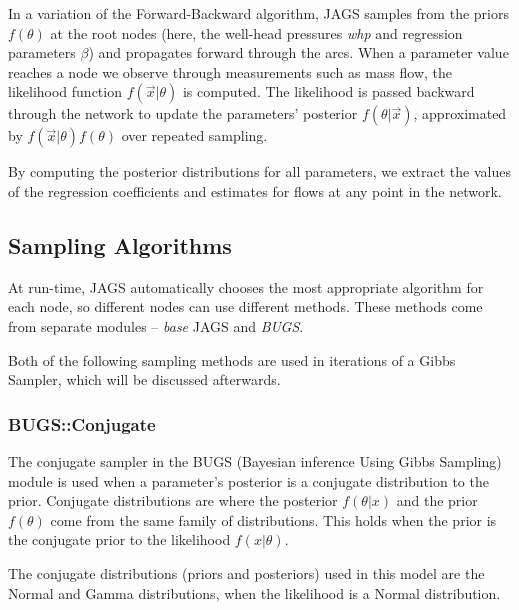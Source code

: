 \documentclass[a4paper, 12pt]{article}
\begin{document}
In a variation of the Forward-Backward algorithm, JAGS samples from the priors $f(\theta)$ at the root nodes (here, the well-head pressures \emph{whp} and regression parameters $\beta$) and propagates forward through the arcs. When a parameter value reaches a node we observe through measurements such as mass flow, the likelihood function $f(\vec{x}|\theta)$ is computed. The likelihood is passed backward through the network to update the parameters' posterior $f(\theta|\vec{x})$, approximated by $f(\vec{x}|\theta)f(\theta)$ over repeated sampling.

By computing the posterior distributions for all parameters, we extract the values of the regression coefficients and estimates for flows at any point in the network.

\subsection{Sampling Algorithms}
At run-time, JAGS automatically chooses the most appropriate algorithm for each node, so different nodes can use different methods. These methods come from separate modules -- \emph{base} JAGS and \emph{BUGS}.

Both of the following sampling methods are used in iterations of a Gibbs Sampler, which will be discussed afterwards.

\subsubsection{BUGS::Conjugate}
The conjugate sampler in the BUGS (Bayesian inference Using Gibbs Sampling) module is used when a parameter's posterior is a conjugate distribution to the prior. Conjugate distributions are where the posterior $f(\theta|x)$ and the prior $f(\theta)$ come from the same family of distributions. This holds when the prior is the conjugate prior to the likelihood $f(x|\theta)$.

The conjugate distributions (priors and posteriors) used in this model are the Normal and Gamma distributions, when the likelihood is a Normal distribution.
\end{document}
